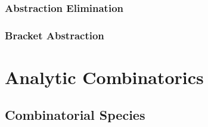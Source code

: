 \subsubsection{Abstraction Elimination}
\label{sec:abstraction_elimination}

\subsubsection{Bracket Abstraction}\label{sec:bracket_abstraction}



\section{Analytic Combinatorics}\label{sec:analytic_combinatorics}
\cite{flajolet-sedgewick09}

\subsection{Combinatorial Species}\label{sec:combinatorial_species}
